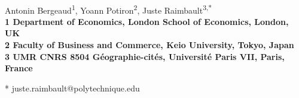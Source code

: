\documentclass[10pt,A4]{article}
\date{}
\begin{document}
\vspace*{0.35in}


\begin{flushleft}
{\Large
\textbf{}
}
\newline
\\
Antonin Bergeaud\textsuperscript{1},
Yoann Potiron\textsuperscript{2},
Juste Raimbault\textsuperscript{3,*}
\\
\bigskip
\bf{1} Department of Economics, London School of Economics, London, UK
\\
\bf{2} Faculty of Business and Commerce, Keio University, Tokyo, Japan
\\
\bf{3} UMR CNRS 8504 G{\'e}ographie-cit{\'e}s, Universit{\'e} Paris VII, Paris, France
\\
\bigskip

% 
%





* juste.raimbault@polytechnique.edu

\end{flushleft}
\end{document}
